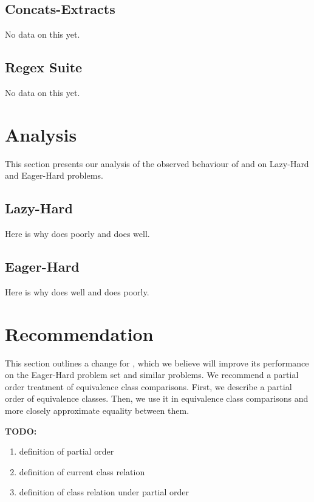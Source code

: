     \subsection{Concats-Extracts}

        No data on this yet.

    \subsection{Regex Suite}

        No data on this yet.

\section{Analysis}

    This section presents our analysis of the observed behaviour of \cvc{} and \us{} on Lazy-Hard and Eager-Hard problems.

    \subsection{Lazy-Hard}

        Here is why \cvc{} does poorly and \us{} does well.

    \subsection{Eager-Hard}

        Here is why \cvc{} does well and \us{} does poorly.

\section{\us{} Recommendation}

    This section outlines a change for \us{}, which we believe will improve its performance on the Eager-Hard problem set and similar problems. We recommend a partial order treatment of equivalence class comparisons. First, we describe a partial order of equivalence classes. Then, we use it in equivalence class comparisons and more closely approximate equality between them.

    \textbf{TODO:}

    \begin{enumerate}
        \item definition of partial order
        \item definition of current class relation
        \item definition of class relation under partial order
    \end{enumerate}
